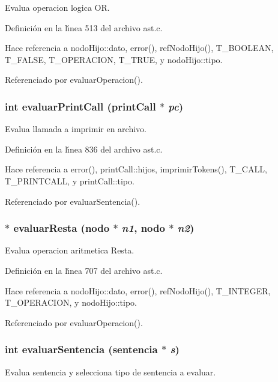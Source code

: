 Evalua operacion logica OR. 



Definici\'{o}n en la l\'{\i}nea 513 del archivo ast.c.

Hace referencia a nodo\-Hijo::dato, error(), ref\-Nodo\-Hijo(), T\_\-BOOLEAN, T\_\-FALSE, T\_\-OPERACION, T\_\-TRUE, y nodo\-Hijo::tipo.

Referenciado por evaluar\-Operacion().
\subsubsection{\setlength{\rightskip}{0pt plus 5cm}int evaluar\-Print\-Call ({\bf print\-Call} $\ast$ {\em pc})}\label{ast_8c_a42}


Evalua llamada a imprimir en archivo. 



Definici\'{o}n en la l\'{\i}nea 836 del archivo ast.c.

Hace referencia a error(), print\-Call::hijos, imprimir\-Tokens(), T\_\-CALL, T\_\-PRINTCALL, y print\-Call::tipo.

Referenciado por evaluar\-Sentencia().
\subsubsection{$\ast$ evaluar\-Resta ({\bf nodo} $\ast$ {\em n1}, {\bf nodo} $\ast$ {\em n2})}\label{ast_8c_a37}


Evalua operacion aritmetica Resta. 



Definici\'{o}n en la l\'{\i}nea 707 del archivo ast.c.

Hace referencia a nodo\-Hijo::dato, error(), ref\-Nodo\-Hijo(), T\_\-INTEGER, T\_\-OPERACION, y nodo\-Hijo::tipo.

Referenciado por evaluar\-Operacion().
\subsubsection{\setlength{\rightskip}{0pt plus 5cm}int evaluar\-Sentencia ({\bf sentencia} $\ast$ {\em s})}\label{ast_8c_a22}


Evalua sentencia y selecciona tipo de sentencia a evaluar. 




